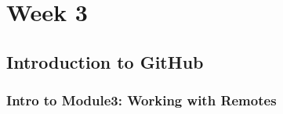 %
%
%
\chapter{Week 3}
\label{intro3} %



\section{Introduction to GitHub} \label{W301}

\subsection{Intro to Module3: Working with Remotes} \label{W301a}

